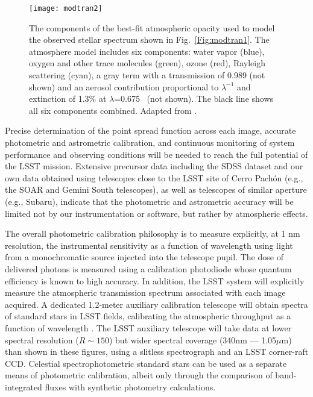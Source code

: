 \begin{figure}
\texttt{[image: modtran2]}
\caption{The components of the best-fit atmospheric opacity used to
model the observed stellar spectrum shown in Fig.~\ref{Fig:modtran1}.
The atmosphere model \citep[MODTRAN,][]{1999SPIE.3866....2A} includes six
components: water vapor (blue), oxygen and other trace molecules
(green), ozone (red), Rayleigh scattering (cyan), a gray term
with a transmission of 0.989 (not shown) and an aerosol contribution
proportional to $\lambda^{-1}$ and extinction of 1.3\% at $\lambda$=0.675 \mic\
(not shown). The black line shows all six components combined.
Adapted from \citet{2010ApJ...720..811B}.}
\label{Fig:modtran2}
\end{figure}


Precise determination of the point spread function across each image,
accurate photometric and astrometric calibration, and continuous monitoring
of system performance and observing conditions will be needed to reach the
full potential of the LSST mission. Extensive precursor data including the
SDSS dataset and our own data obtained using telescopes close to
the LSST site of Cerro Pach\'{o}n (e.g., the SOAR and Gemini South telescopes),
as well as telescopes of similar aperture (e.g., Subaru), indicate that the
photometric and astrometric accuracy will be limited not by our instrumentation
or software, but rather by atmospheric effects.


The overall photometric calibration philosophy \citep{2006ApJ...646.1436S} is to measure explicitly, at 1 nm resolution, the
instrumental sensitivity as a function of wavelength using light from a monochromatic source injected
into the telescope pupil. The dose of delivered photons is measured using a calibration photodiode whose quantum
efficiency is known to high accuracy. In addition, the LSST system will explicitly measure the atmospheric transmission
spectrum associated with each image acquired. A
dedicated 1.2-meter auxiliary calibration telescope will obtain spectra of
standard stars in LSST fields, calibrating the atmospheric throughput
as a function of wavelength  \citep[][see Figs.~\ref{Fig:modtran1} and \ref{Fig:modtran2}]{2007PASP..119.1163S}.
The LSST auxiliary telescope will take
data at lower spectral resolution ($R \sim 150$) but wider spectral
coverage (340nm --- 1.05$\mu$m) than shown in these figures, using a
slitless spectrograph and an LSST corner-raft CCD.
Celestial spectrophotometric standard stars can be used as a separate means of photometric calibration, albeit only through the
comparison of band-integrated fluxes with synthetic photometry calculations.

